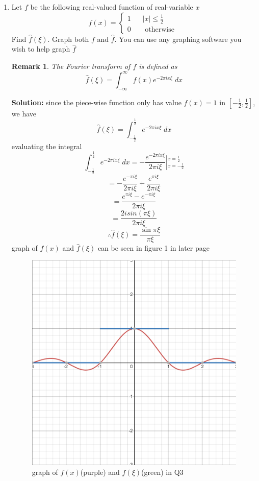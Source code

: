 \documentclass[12pt]{article}
\newtheorem*{remark}{Remark}
\begin{document}
\begin{enumerate}
\item Let $f$ be the following real-valued function of real-variable $x$
\[
f(x) = 
\left\{
\begin{aligned} 
1 & \;\;\;|x| \leq \frac{1}{2} \\
0 & \;\;\; \mbox{ otherwise }
\end{aligned}
\right.
\]
Find $\hat{f}(\xi)$.  Graph both $f$ and $\hat{f}$.  You can use any graphing software you wish to help graph $\hat{f}$
\begin{remark}  
The Fourier transform of $f$ is defined as 
\[
\hat{f}(\xi) = \int_{-\infty}^{\infty} f(x) e^{-2\pi i x \xi} \; dx 
\]


\end{remark} 
\textbf{Solution:}
since the piece-wise function only has value $f(x)=1$ in $[-\frac{1}{2},\frac{1}{2}]$, we have
\[
\hat{f}(\xi)=\int_{-\frac{1}{2}}^{\frac{1}{2}} e^{-2\pi i x \xi} \; dx
\]
evaluating the integral
\[
\int_{-\frac{1}{2}}^{\frac{1}{2}} e^{-2\pi i x \xi} \; dx =   
-\frac{e^{-2\pi i x \xi}}{2\pi i \xi} \left|_{x=-\frac{1}{2}}^{x=\frac{1}{2}} \right.
\]
\[
=-\frac{e^{-\pi i \xi}}{2\pi i \xi} + \frac{e^{\pi i \xi}}{2\pi i \xi}
\]
\[
=\frac{e^{\pi i \xi} - e^{-\pi i \xi}}{2\pi i \xi}
\]
\[
=\frac{2isin(\pi\xi)}{2\pi i \xi}
\]
\[
\therefore \hat{f}(\xi)=\frac{\sin{\pi\xi}}{\pi\xi}
\]
graph of $f(x)$ and $\hat{f}(\xi)$ can be seen in figure 1 in later page

\begin{figure}
    \centering
    \includegraphics[width=0.5\linewidth]{pictures/image for Q3.png}
    \caption{graph of $f(x)$(purple) and $\hat{f}(\xi)$(green) in Q3}
    \label{fig:enter-label}
\end{figure}



\end{enumerate}
\end{document}
